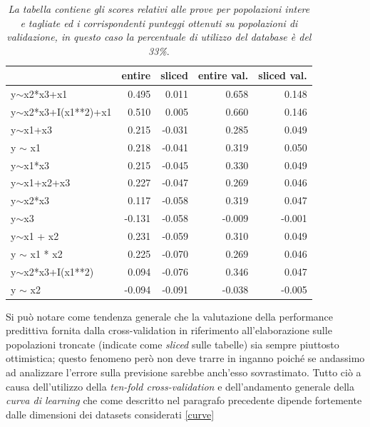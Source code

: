 \documentclass[12pt,openright,twoside,a4paper]{book}
\begin{document}
\begin{table}[!h]
\begin{tabular}{lrrrr}
\toprule
{} &  entire &  sliced &  entire val. &  sliced val. \\
\midrule
y$\sim$x2*x3+x1          &         0.495 &         0.011 &             0.658 &             0.148 \\
y$\sim$x2*x3+I(x1**2)+x1 &         0.510 &         0.005 &             0.660 &             0.146 \\
y$\sim$x1+x3             &         0.215 &        -0.031 &             0.285 &             0.049 \\
y $\sim$ x1              &         0.218 &        -0.041 &             0.319 &             0.050 \\
y$\sim$x1*x3             &         0.215 &        -0.045 &             0.330 &             0.049 \\
y$\sim$x1+x2+x3          &         0.227 &        -0.047 &             0.269 &             0.046 \\
y$\sim$x2*x3             &         0.117 &        -0.058 &             0.319 &             0.047 \\
y$\sim$x3                &        -0.131 &        -0.058 &            -0.009 &            -0.001 \\
y$\sim$x1 + x2           &         0.231 &        -0.059 &             0.310 &             0.049 \\
y $\sim$ x1 * x2         &         0.225 &        -0.070 &             0.269 &             0.046 \\
y$\sim$x2*x3+I(x1**2)    &         0.094 &        -0.076 &             0.346 &             0.047 \\
y $\sim$ x2              &        -0.094 &        -0.091 &            -0.038 &            -0.005 \\
\bottomrule
\end{tabular}
\caption{\textit{La tabella contiene gli scores relativi alle prove per popolazioni intere e tagliate ed i corrispondenti punteggi  ottenuti su popolazioni di validazione, in questo caso la percentuale di utilizzo del database è del 33\%}.}
\end{table}

\pagebreak

Si può notare come tendenza generale che la valutazione della performance predittiva fornita dalla cross-validation in riferimento all'elaborazione sulle popolazioni troncate (indicate come \textit{sliced} sulle tabelle) sia sempre piuttosto ottimistica; questo fenomeno però non deve trarre in inganno poiché se andassimo ad analizzare l'errore sulla previsione sarebbe anch'esso sovrastimato.
Tutto ciò a causa dell'utilizzo della \textit{ten-fold cross-validation} e dell'andamento generale della \textit{ curva di learning} che come descritto nel paragrafo precedente dipende fortemente dalle dimensioni dei datasets considerati \ref{curve}
\end{document}
